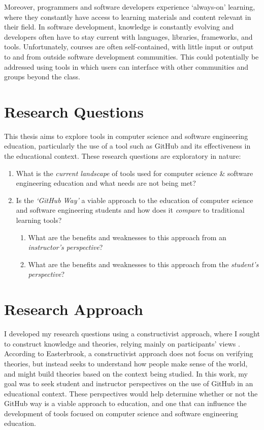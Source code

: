 
Moreover, programmers and software developers experience `always-on' learning, where they constantly have access to learning materials and content relevant in their field. In software development, knowledge is constantly evolving and developers often have to stay current with languages, libraries, frameworks, and tools. Unfortunately, courses are often self-contained, with little input or output to and from outside software development communities. This could potentially be addressed using tools in which users can interface with other communities and groups beyond the class.


\section{Research Questions}
This thesis aims to explore tools in computer science and software engineering education, particularly the use of a tool such as GitHub and its effectiveness in the educational context. These research questions are exploratory in nature: \\
\begin{enumerate}
\item What is the \emph{current landscape} of tools used for computer science \& software engineering education and what needs are not being met?
\item Is the \emph{`GitHub Way'} a viable approach to the education of computer science and software engineering students and how does it \emph{compare} to traditional learning tools?
\begin{enumerate}
    \item What are the benefits and weaknesses to this approach from an \emph{instructor's perspective}?
    \item What are the benefits and weaknesses to this approach from the \emph{student's perspective}?
\end{enumerate}
\end{enumerate}

\section{Research Approach}
I developed my research questions using a constructivist approach, where I sought to construct knowledge and theories, relying mainly on participants' views \cite{easterbrook2008selecting}. According to Easterbrook, a constructivist approach does not focus on verifying theories, but instead seeks to understand how people make sense of the world, and might build theories based on the context being studied. In this work, my goal was to seek student and instructor perspectives on the use of GitHub in an educational context. These perspectives would help determine whether or not the GitHub way is a viable approach to education, and one that can influence the development of tools focused on computer science and software engineering education.

